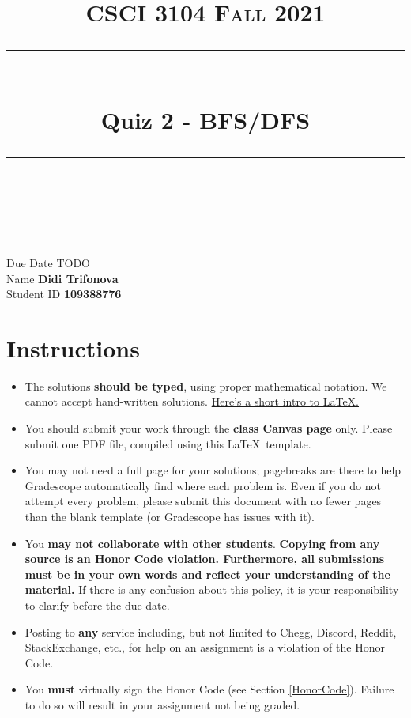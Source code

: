 \documentclass[11pt]{article}
\title{
\normalfont \normalsize 
\textsc{CSCI 3104 Fall 2021} \\
[10pt] 
\rule{\linewidth}{0.5pt} \\[6pt] 
\huge Quiz 2 - BFS/DFS \\
\rule{\linewidth}{2pt}  \\[10pt]
}
\date{}
\theoremstyle{definition}
\theoremstyle{definition}
\theoremstyle{definition}
\begin{document}
\maketitle


\noindent
Due Date \dotfill TODO \\
Name \dotfill \textbf{Didi Trifonova} \\
Student ID \dotfill \textbf{109388776} \\


\tableofcontents

\section{Instructions}
 \begin{itemize}
	\item The solutions \textbf{should be typed}, using proper mathematical notation. We cannot accept hand-written solutions. \href{http://ece.uprm.edu/~caceros/latex/introduction.pdf}{Here's a short intro to \LaTeX.}
	\item You should submit your work through the \textbf{class Canvas page} only. Please submit one PDF file, compiled using this \LaTeX \ template.
	\item You may not need a full page for your solutions; pagebreaks are there to help Gradescope automatically find where each problem is. Even if you do not attempt every problem, please submit this document with no fewer pages than the blank template (or Gradescope has issues with it).

	\item You \textbf{may not collaborate with other students}. \textbf{Copying from any source is an Honor Code violation. Furthermore, all submissions must be in your own words and reflect your understanding of the material.} If there is any confusion about this policy, it is your responsibility to clarify before the due date. 

	\item Posting to \textbf{any} service including, but not limited to Chegg, Discord, Reddit, StackExchange, etc., for help on an assignment is a violation of the Honor Code.

	\item You \textbf{must} virtually sign the Honor Code (see Section \ref{HonorCode}). Failure to do so will result in your assignment not being graded.
\end{itemize}
\end{document}
